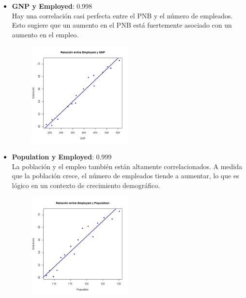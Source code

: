 \documentclass{article}
\begin{document}
\begin{itemize}
    \item \textbf{GNP y Employed}: 0.998\\
    Hay una correlación casi perfecta entre el PNB y el número de empleados. Esto sugiere que un aumento en el PNB está fuertemente asociado con un aumento en el empleo.
    \begin{figure}[H]
        \centering
        \includegraphics[width=0.5\textwidth]{Graficos_Dispersion/GNP_vs_Employed.png}
        \label{fig:GNP_vs_Employed}
        \vspace{0.5cm} %
    \end{figure}

    \item \textbf{Population y Employed}: 0.999\\
    La población y el empleo también están altamente correlacionados. A medida que la población crece, el número de empleados tiende a aumentar, lo que es lógico en un contexto de crecimiento demográfico.
    \begin{figure}[H]
        \centering
        \includegraphics[width=0.5\textwidth]{Graficos_Dispersion/Population_vs_Employed.png}
        \label{fig:Population_vs_Employed}
        \vspace{0.5cm} %
    \end{figure}
\end{itemize}
\end{document}
